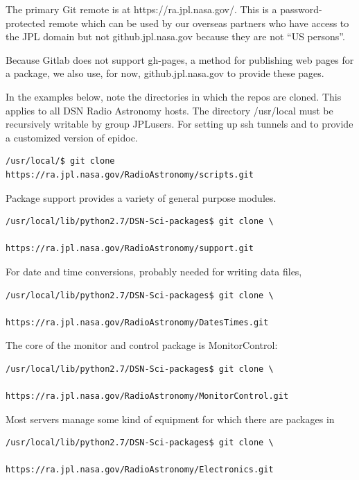 \documentclass[letterpaper,11pt]{book}
\begin{document}
The primary Git remote is at 
{\ttfamily https://ra.jpl.nasa.gov/}.  This is a password-protected remote
which can be used by our overseas partners who have access to the JPL domain
but not {\ttfamily github.jpl.nasa.gov} because they are not ``US persons''.

Because Gitlab does not support {\ttfamily gh-pages}, a method for publishing
web pages for a package, we also use, for now, {\ttfamily github.jpl.nasa.gov}
to provide these pages.

In the examples below, note the directories in which the repos are cloned.
This applies to all DSN Radio Astronomy hosts. The directory
{\ttfamily /usr/local} must be recursively writable by group {\ttfamily JPLusers}.
For setting up ssh tunnels and to provide a customized
version of {\ttfamily epidoc}.  
\begin{verbatim}
/usr/local/$ git clone https://ra.jpl.nasa.gov/RadioAstronomy/scripts.git\end{verbatim}
\noindent Package {\ttfamily support} provides a variety of general purpose modules.
\begin{verbatim}
/usr/local/lib/python2.7/DSN-Sci-packages$ git clone \
                           https://ra.jpl.nasa.gov/RadioAstronomy/support.git\end{verbatim}
\noindent For date and time conversions, probably needed for writing data files,
\begin{verbatim}
/usr/local/lib/python2.7/DSN-Sci-packages$ git clone \
                         https://ra.jpl.nasa.gov/RadioAstronomy/DatesTimes.git\end{verbatim}
\noindent The core of the monitor and control package is {\ttfamily MonitorControl}:
\begin{verbatim}
/usr/local/lib/python2.7/DSN-Sci-packages$ git clone \
                     https://ra.jpl.nasa.gov/RadioAstronomy/MonitorControl.git\end{verbatim}

Most servers manage some kind of equipment for which there are packages in
\begin{verbatim}
/usr/local/lib/python2.7/DSN-Sci-packages$ git clone \
                        https://ra.jpl.nasa.gov/RadioAstronomy/Electronics.git\end{verbatim}
\end{document}

